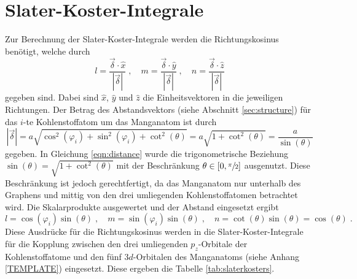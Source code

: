 \section{Slater-Koster-Integrale}
\label{sec:slaterkostercalc}
Zur Berechnung der Slater-Koster-Integrale werden die Richtungskosinus benötigt, welche durch
\begin{equation*}
    l = \frac{\vec{\delta} \cdot \hat{x}}{\left | \vec{\delta} \right |} \; , \quad
    m = \frac{\vec{\delta} \cdot \hat{y}}{\left | \vec{\delta} \right |} \; , \quad
    n = \frac{\vec{\delta} \cdot \hat{z}}{\left | \vec{\delta} \right |}
\end{equation*}
gegeben sind.
Dabei sind $\hat{x}$, $\hat{y}$ und $\hat{z}$ die Einheitsvektoren in die jeweiligen Richtungen. 
Der Betrag des Abstandsvektors (siehe Abschnitt \ref{sec:structure}) für das $i$-te Kohlenstoffatom um das Manganatom ist durch 
\begin{equation}
    \left | \vec{\delta} \right | = a \sqrt{\cos^2(\varphi_i) + \sin^2(\varphi_i) + \cot^2(\theta)} = a \sqrt{1+\cot^2(\theta)} = \frac{a}{\sin(\theta)} \label{eqn:distance}
\end{equation}
gegeben.
In Gleichung \eqref{eqn:distance} wurde die trigonometrische Beziehung $\sin(\theta) = \sqrt{1+\cot^2(\theta)}$ \cite{trig} mit der Beschränkung
$\theta \in [ 0, \sfrac{\pi}{2} ] $ ausgenutzt. 
Diese Beschränkung ist jedoch gerechtfertigt, da das Manganatom nur unterhalb des Graphens und mittig von den drei umliegenden Kohlenstoffatomen betrachtet wird.
Die Skalarprodukte ausgewertet und der Abstand eingesetzt ergibt
\begin{equation*}
    l = \cos(\varphi_i) \sin(\theta) \; , \quad
    m = \sin(\varphi_i) \sin(\theta) \; , \quad
    n = \cot(\theta) \sin(\theta) = \cos(\theta) \; .
\end{equation*}
Diese Ausdrücke für die Richtungskosinus werden in die Slater-Koster-Integrale für die Kopplung zwischen den drei umliegenden 
$p_z$-Orbitale der Kohlenstoffatome und den fünf $3d$-Orbitalen des Manganatoms (siehe Anhang \ref{TEMPLATE}) eingesetzt.
Diese ergeben die Tabelle \ref{tab:slaterkosters}.

